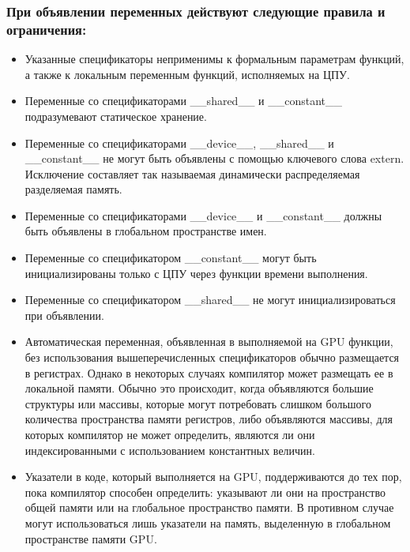 \documentclass[a4paper, 12pt]{article}
\begin{document}
\subsubsection{При объявлении переменных действуют следующие правила и 
ограничения:}

\begin{itemize}
\item Указанные спецификаторы неприменимы к формальным параметрам 
функций, а также к локальным переменным функций, исполняемых на ЦПУ.

\item Переменные со спецификаторами \_\_shared\_\_ и \_\_constant\_\_ 
подразумевают статическое хранение. 

\item Переменные со спецификаторами \_\_device\_\_, \_\_shared\_\_ и \_\_constant\_\_ не могут быть объявлены с помощью ключевого слова extern. Исключение 
составляет так называемая динамически распределяемая разделяемая 
память.

\item Переменные со спецификаторами \_\_device\_\_ и \_\_constant\_\_ должны быть 
объявлены в глобальном пространстве имен. 

\item Переменные со спецификатором \_\_constant\_\_ могут быть 
инициализированы только с ЦПУ через функции времени выполнения. 
\item Переменные со спецификатором \_\_shared\_\_ не могут инициализироваться 
при объявлении.

\item Автоматическая переменная, объявленная в выполняемой на GPU 
функции, без использования вышеперечисленных спецификаторов обычно 
размещается в регистрах. Однако в некоторых случаях компилятор может 
размещать ее в локальной памяти. Обычно это происходит, когда 
объявляются большие структуры или массивы, которые могут потребовать 
слишком большого количества пространства памяти регистров, либо 
объявляются массивы, для которых компилятор не может определить, 
являются ли они индексированными с использованием константных 
величин.
 
\item Указатели в коде, который выполняется на GPU, поддерживаются до тех 
пор, пока компилятор способен определить: указывают ли они на 
пространство общей памяти или на глобальное пространство памяти. В 
противном случае могут использоваться лишь указатели на память, 
выделенную в глобальном пространстве памяти GPU. 
\end{itemize}
\end{document}

